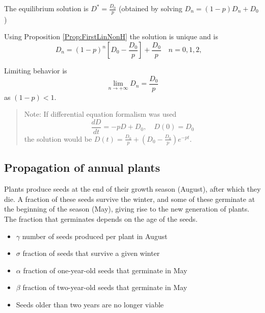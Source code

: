The equilibrium solution is $D^*=\frac{D_0}{p}$ (obtained by solving $D_{n}=(1-p)D_n +D_0$)
 
Using Proposition \ref{Prop:FirstLinNonH} the solution is unique and is
$$D_n=(1-p)^n\left [D_0-\frac{D_0}{p}\right ] +\frac{D_0}{p} \quad n=0,1,2,\quad$$

Limiting behavior is
$$\lim _{n\rightarrow +\infty}D_n=\frac{D_0}{p}$$
as $(1-p)<1$.

\begin{quote}
Note: If differential equation formalism was used
$$\frac{dD}{dt}=-pD +D_0, \quad D(0)=D_0$$
the solution would be $D(t)=\frac{D_0}{p}+(D_0-\frac{D_0}{p})e^{-pt}$.
\end{quote}


\subsection{Propagation of annual plants}
Plants produce seeds at the end of their growth season (August), after which they die. A fraction of these seeds survive the winter, and some of these germinate at the beginning of the season (May), giving rise to the new generation of plants. The fraction that germinates depends on the age of the seeds. 
\begin{itemize}
\item $\gamma$ number of seeds produced per plant in August
\item $\sigma$ fraction of seeds that survive a given winter
\item $\alpha$ fraction of one-year-old seeds that germinate in May
\item $\beta$ fraction of two-year-old seeds that germinate in May
\item Seeds older than two years are no longer viable
\end{itemize}

